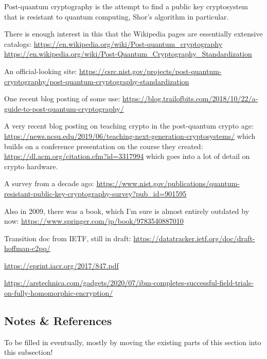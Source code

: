 



Post-quantum cryptography is the attempt to find a public key
cryptosystem that is resistant to quantum computing, Shor's algorithm
in particular.

There is enough interest in this that the Wikipedia pages are
essentially extensive catalogs:
\url{https://en.wikipedia.org/wiki/Post-quantum_cryptography}
\url{https://en.wikipedia.org/wiki/Post-Quantum_Cryptography_Standardization}

An official-looking site:
\url{https://csrc.nist.gov/projects/post-quantum-cryptography/post-quantum-cryptography-standardization}

One recent blog posting of some use:
\url{https://blog.trailofbits.com/2018/10/22/a-guide-to-post-quantum-cryptography/}

A very recent blog posting on teaching crypto in the post-quantum
crypto age:
\url{https://news.ncsu.edu/2019/06/teaching-next-generation-cryptosystems/}
which builds on a conference presentation on the course they created:
\url{https://dl.acm.org/citation.cfm?id=3317994}
which goes into a lot of detail on crypto hardware.

A survey from a decade ago:
\url{https://www.nist.gov/publications/quantum-resistant-public-key-cryptography-survey?pub_id=901595}

Also in 2009, there was a book, which I'm sure is almost entirely
outdated by now:
\url{https://www.springer.com/jp/book/9783540887010}

Transition doc from IETF, still in draft:
\url{https://datatracker.ietf.org/doc/draft-hoffman-c2pq/}

\url{https://eprint.iacr.org/2017/847.pdf}

\url{https://arstechnica.com/gadgets/2020/07/ibm-completes-successful-field-trials-on-fully-homomorphic-encryption/}

\subsection{Notes \& References}

To be filled in eventually, mostly by moving the existing parts of
this section into this subsection!




